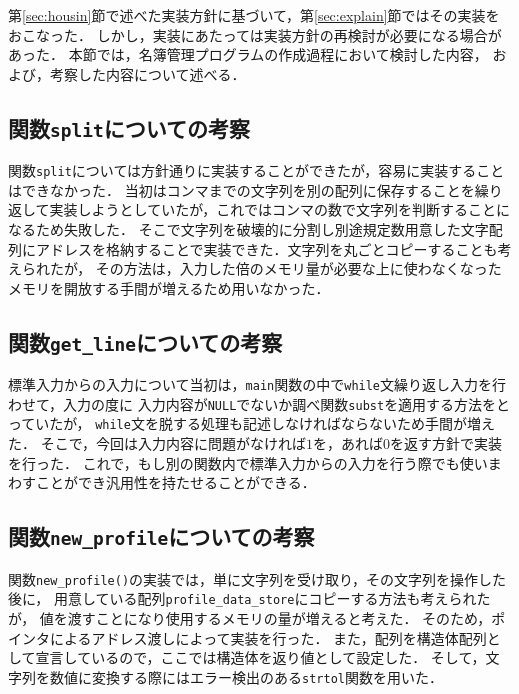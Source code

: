 \documentclass[a4j,11pt]{jarticle}
\begin{document}
第\ref{sec:housin}節で述べた実装方針に基づいて，第\ref{sec:explain}節ではその実装をおこなった．
しかし，実装にあたっては実装方針の再検討が必要になる場合があった．
本節では，名簿管理プログラムの作成過程において検討した内容，
および，考察した内容について述べる．

\subsection{関数\texttt{split}についての考察}

関数\verb|split|については方針通りに実装することができたが，容易に実装することはできなかった．
当初はコンマまでの文字列を別の配列に保存することを繰り返して実装しようとしていたが，これではコンマの数で文字列を判断することになるため失敗した．
そこで文字列を破壊的に分割し別途規定数用意した文字配列にアドレスを格納することで実装できた．文字列を丸ごとコピーすることも考えられたが，
その方法は，入力した倍のメモリ量が必要な上に使わなくなったメモリを開放する手間が増えるため用いなかった．

\subsection{関数\texttt{get\_line}についての考察}
標準入力からの入力について当初は，\verb|main|関数の中で\verb|while|文繰り返し入力を行わせて，入力の度に
入力内容が\verb|NULL|でないか調べ関数\verb|subst|を適用する方法をとっていたが，
\verb|while|文を脱する処理も記述しなければならないため手間が増えた．
そこで，今回は入力内容に問題がなければ$1$を，あれば$0$を返す方針で実装を行った．
これで，もし別の関数内で標準入力からの入力を行う際でも使いまわすことができ汎用性を持たせることができる．

\subsection{関数\texttt{new\_profile}についての考察}
関数\verb|new_profile()|の実装では，単に文字列を受け取り，その文字列を操作した後に，
用意している配列\verb|profile_data_store|にコピーする方法も考えられたが，
値を渡すことになり使用するメモリの量が増えると考えた．
そのため，ポインタによるアドレス渡しによって実装を行った．
また，配列を構造体配列として宣言しているので，ここでは構造体を返り値として設定した．
そして，文字列を数値に変換する際にはエラー検出のある\verb|strtol|関数を用いた．
\end{document}
